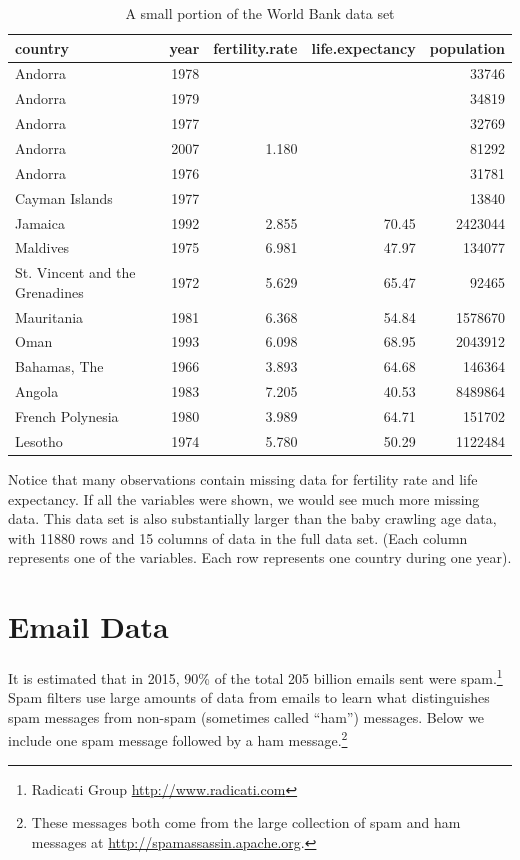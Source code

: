 \documentclass[
]{krantz}
\begin{document}
\begin{table}[t]

\caption{\label{tab:worldBank}A small portion of the World Bank data set}
\centering
\begin{tabular}{lrrrr}
\toprule
country & year & fertility.rate & life.expectancy & population\\
\midrule
Andorra & 1978 &  &  & 33746\\
Andorra & 1979 &  &  & 34819\\
Andorra & 1977 &  &  & 32769\\
Andorra & 2007 & 1.180 &  & 81292\\
Andorra & 1976 &  &  & 31781\\
\addlinespace
Cayman Islands & 1977 &  &  & 13840\\
Jamaica & 1992 & 2.855 & 70.45 & 2423044\\
Maldives & 1975 & 6.981 & 47.97 & 134077\\
St. Vincent and the Grenadines & 1972 & 5.629 & 65.47 & 92465\\
Mauritania & 1981 & 6.368 & 54.84 & 1578670\\
\addlinespace
Oman & 1993 & 6.098 & 68.95 & 2043912\\
Bahamas, The & 1966 & 3.893 & 64.68 & 146364\\
Angola & 1983 & 7.205 & 40.53 & 8489864\\
French Polynesia & 1980 & 3.989 & 64.71 & 151702\\
Lesotho & 1974 & 5.780 & 50.29 & 1122484\\
\bottomrule
\end{tabular}
\end{table}

Notice that many observations contain missing data for fertility rate and life expectancy. If all the variables were shown, we would see much more missing data. This data set is also substantially larger than the baby crawling age data, with 11880 rows and 15 columns of data in the full data set. (Each column represents one of the variables. Each row represents one country during one year).

\hypertarget{email-data}{%
\section{Email Data}\label{email-data}}

It is estimated that in 2015, 90\% of the total 205 billion emails sent were spam.\footnote{Radicati Group \url{http://www.radicati.com}} Spam filters use large amounts of data from emails to learn what distinguishes spam messages from non-spam (sometimes called ``ham'') messages. Below we include one spam message followed by a ham message.\footnote{These messages both come from the large collection of spam and ham messages at \url{http://spamassassin.apache.org}.}
\end{document}
